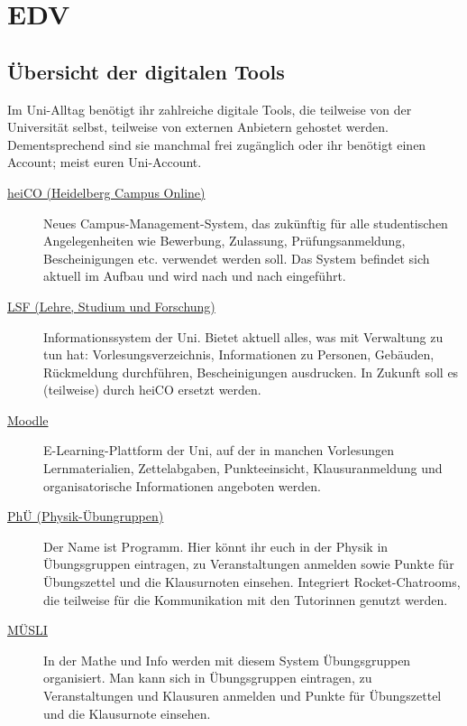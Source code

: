 \section{EDV}

\subsection{Übersicht der digitalen Tools}
\label{digitale-tools-uebersicht}

Im Uni-Alltag benötigt ihr zahlreiche digitale Tools, die teilweise von der Universität selbst, teilweise von externen Anbietern gehostet werden. Dementsprechend sind sie manchmal frei zugänglich oder ihr benötigt einen Account; meist euren Uni-Account.

\begin{description}
    \item[\href{https://heico.uni-heidelberg.de/}{heiCO (Heidelberg Campus Online)}]
    Neues Campus-Management-System, das zukünftig für alle studentischen Angelegenheiten wie Bewerbung, Zulassung, Prüfungsanmeldung, Bescheinigungen etc. verwendet werden soll. Das System befindet sich aktuell im Aufbau und wird nach und nach eingeführt.

	\item[\href{https://lsf.uni-heidelberg.de/}{LSF (Lehre, Studium und Forschung)}]
    Informationssystem der Uni. Bietet aktuell alles, was mit Verwaltung zu tun hat: Vorlesungsverzeichnis, Informationen zu Personen, Gebäuden, Rückmeldung durchführen, Bescheinigungen ausdrucken. In Zukunft soll es (teilweise) durch heiCO ersetzt werden.

	\item[\href{https://moodle.uni-heidelberg.de}{Moodle}]
    E-Learning-Plattform der Uni, auf der in manchen Vorlesungen Lernmaterialien, Zettelabgaben, Punkteeinsicht, Klausuranmeldung und organisatorische Informationen angeboten werden.

	\item[\href{https://uebungen.physik.uni-heidelberg.de}{PhÜ (Physik-Übungruppen)}]
    Der Name ist Programm. Hier könnt ihr euch in der Physik in Übungsgruppen eintragen, zu Veranstaltungen anmelden sowie Punkte für Übungszettel und die Klausurnoten einsehen. Integriert Rocket-Chatrooms, die teilweise für die Kommunikation mit den Tutorinnen genutzt werden.

	\item[\href{https://muesli.mathi.uni-heidelberg.de}{MÜSLI}]
    In der Mathe und Info werden mit diesem System Übungsgruppen organisiert. Man kann sich in Übungsgruppen eintragen, zu Veranstaltungen und Klausuren anmelden und Punkte für Übungszettel und die Klausurnote einsehen.


\end{description}
